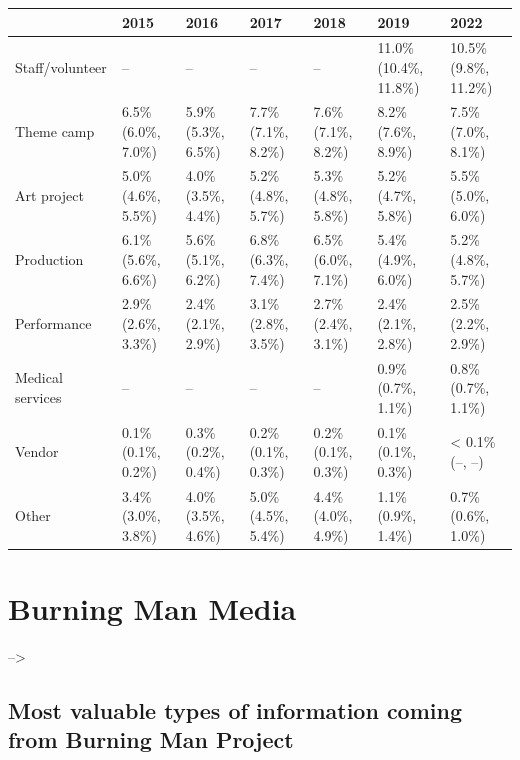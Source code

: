 \documentclass[
]{book}
\begin{document}
\begin{table}
\centering
\begin{tabular}[t]{>{}l|>{}l|>{}l|>{}l|>{}l|>{}l|>{}l}
\hline
  & 2015 & 2016 & 2017 & 2018 & 2019 & 2022\\
\hline
Staff/volunteer & -- & -- & -- & -- & 11.0\% (10.4\%, 11.8\%) & 10.5\% (9.8\%, 11.2\%)\\
\hline
Theme camp & 6.5\% (6.0\%, 7.0\%) & 5.9\% (5.3\%, 6.5\%) & 7.7\% (7.1\%, 8.2\%) & 7.6\% (7.1\%, 8.2\%) & 8.2\% (7.6\%, 8.9\%) & 7.5\% (7.0\%, 8.1\%)\\
\hline
Art project & 5.0\% (4.6\%, 5.5\%) & 4.0\% (3.5\%, 4.4\%) & 5.2\% (4.8\%, 5.7\%) & 5.3\% (4.8\%, 5.8\%) & 5.2\% (4.7\%, 5.8\%) & 5.5\% (5.0\%, 6.0\%)\\
\hline
Production & 6.1\% (5.6\%, 6.6\%) & 5.6\% (5.1\%, 6.2\%) & 6.8\% (6.3\%, 7.4\%) & 6.5\% (6.0\%, 7.1\%) & 5.4\% (4.9\%, 6.0\%) & 5.2\% (4.8\%, 5.7\%)\\
\hline
Performance & 2.9\% (2.6\%, 3.3\%) & 2.4\% (2.1\%, 2.9\%) & 3.1\% (2.8\%, 3.5\%) & 2.7\% (2.4\%, 3.1\%) & 2.4\% (2.1\%, 2.8\%) & 2.5\% (2.2\%, 2.9\%)\\
\hline
Medical services & -- & -- & -- & -- & 0.9\% (0.7\%, 1.1\%) & 0.8\% (0.7\%, 1.1\%)\\
\hline
Vendor & 0.1\% (0.1\%, 0.2\%) & 0.3\% (0.2\%, 0.4\%) & 0.2\% (0.1\%, 0.3\%) & 0.2\% (0.1\%, 0.3\%) & 0.1\% (0.1\%, 0.3\%) & < 0.1\% (--, --)\\
\hline
Other & 3.4\% (3.0\%, 3.8\%) & 4.0\% (3.5\%, 4.6\%) & 5.0\% (4.5\%, 5.4\%) & 4.4\% (4.0\%, 4.9\%) & 1.1\% (0.9\%, 1.4\%) & 0.7\% (0.6\%, 1.0\%)\\
\hline
\end{tabular}
\end{table}

\hypertarget{burning-man-media}{%
\section{Burning Man Media}\label{burning-man-media}}

--\textgreater{}

\hypertarget{most-valuable-types-of-information-coming-from-burning-man-project}{%
\subsection{Most valuable types of information coming from Burning Man Project}\label{most-valuable-types-of-information-coming-from-burning-man-project}}
\end{document}
